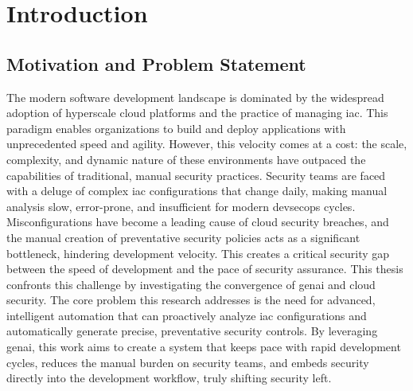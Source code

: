 
\chapter{Introduction}
\label{chap:introduction}


\newcommand{\keyword}[1]{\textbf{#1}}
\newcommand{\tabhead}[1]{\textbf{#1}}
\newcommand{\code}[1]{\texttt{#1}}
\newcommand{\file}[1]{\texttt{\bfseries#1}}
\newcommand{\option}[1]{\texttt{\itshape#1}}


\section{Motivation and Problem Statement}
\label{sec:motivation_problem}

The modern software development landscape is dominated by the widespread adoption of \gls{hyperscale} cloud platforms and the practice of managing \gls{iac}. This paradigm enables organizations to build and deploy applications with unprecedented speed and agility. However, this velocity comes at a cost: the scale, complexity, and dynamic nature of these environments have outpaced the capabilities of traditional, manual security practices\cite{khanna_enhancing_2024}. Security teams are faced with a deluge of complex \gls{iac} configurations that change daily, making manual analysis slow, error-prone, and insufficient for modern \gls{devsecops} cycles\cite{gunathilaka_context-aware_2025}. Misconfigurations have become a leading cause of cloud security breaches, and the manual creation of preventative security policies acts as a significant bottleneck, hindering development velocity\cite{tunc_cloud_2017, fu_ai_2025}. This creates a critical security gap between the speed of development and the pace of security assurance. This thesis confronts this challenge by investigating the convergence of \gls{genai} and cloud security. The core problem this research addresses is the need for advanced, intelligent automation that can proactively analyze \gls{iac} configurations and automatically generate precise, preventative security controls. By leveraging \gls{genai}, this work aims to create a system that keeps pace with rapid development cycles, reduces the manual burden on security teams, and embeds security directly into the development workflow, truly shifting security left.

